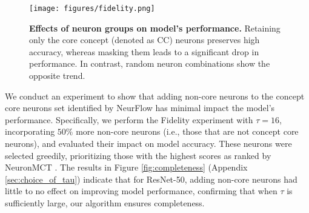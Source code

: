 \begin{figure}
\vspace{-12mm}
\begin{center}
\texttt{[image: figures/fidelity.png]} 
\end{center}
\vspace{-12pt}
\caption{\textbf{Effects of neuron groups on model's performance.} Retaining only the core concept (denoted as CC) neurons preserves high accuracy, whereas masking them leads to a significant drop in performance. In contrast, random neuron combinations show the opposite trend.} \label{figure4}
\vspace{-13pt}
\end{figure}
We conduct an experiment to show that adding non-core neurons to the concept core neurons set identified by NeurFlow has minimal impact the model's performance. Specifically, we perform the Fidelity experiment with $\tau = 16$, incorporating $50\%$ more non-core neurons (i.e., those that are not concept core neurons), and evaluated their impact on model accuracy. These neurons were selected greedily, prioritizing those with the highest scores as ranked by NeuronMCT \cite{neuronmct}. The results in Figure \ref{fig:completeness} (Appendix \ref{sec:choice_of_tau}) indicate that for ResNet-50, adding non-core neurons had little to no effect on improving model performance, confirming that when $\tau$ is sufficiently large, our algorithm ensures completeness.

